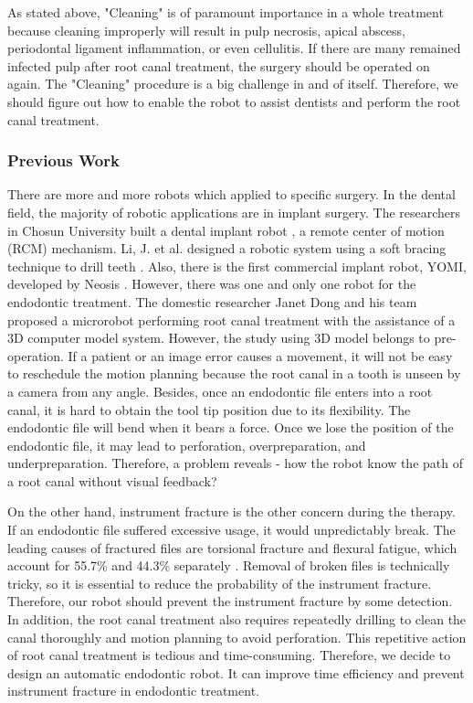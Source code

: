 \par
As stated above, "Cleaning" is of paramount importance in a whole treatment because cleaning improperly will result in pulp necrosis, apical abscess, periodontal ligament inflammation, or even cellulitis. If there are many remained infected pulp after root canal treatment, the surgery should be operated on again. The "Cleaning" procedure is a big challenge in and of itself. Therefore, we should figure out how to enable the robot to assist dentists and perform the root canal treatment.
\subsubsection{Previous Work}
\hspace*{6mm}There are more and more robots which applied to specific surgery. In the dental field, the majority of robotic applications are in implant surgery. The researchers in Chosun University built a dental implant robot \cite{Kim2009ASO}, a remote center of motion (RCM) mechanism. Li, J. et al. designed a robotic system using a soft bracing technique to drill teeth \cite{Li2019ACD}. Also, there is the first commercial implant robot, YOMI, developed by Neosis \cite{web3}. However, there was one and only one robot for the endodontic treatment. The domestic researcher Janet Dong and his team proposed a microrobot performing root canal treatment with the assistance of a 3D computer model system. However, the study using 3D model belongs to pre-operation. If a patient or an image error causes a movement, it will not be easy to reschedule the motion planning because the root canal in a tooth is unseen by a camera from any angle. Besides, once an endodontic file enters into a root canal, it is hard to obtain the tool tip position due to its flexibility. The endodontic file will bend when it bears a force. Once we lose the position of the endodontic file, it may lead to perforation, overpreparation, and underpreparation. Therefore, a problem reveals - how the robot know the path of a root canal without visual feedback? 
\par
On the other hand, instrument fracture is the other concern during the therapy. If an endodontic file suffered excessive usage, it would unpredictably break. The leading causes of fractured files are torsional fracture and flexural fatigue, which account for 55.7\% and 44.3\% separately \cite{SATTAPAN2000161}. Removal of broken files is technically tricky, so it is essential to reduce the probability of the instrument fracture. Therefore, our robot should prevent the instrument fracture by some detection. In addition, the root canal treatment also requires repeatedly drilling to clean the canal thoroughly and motion planning to avoid perforation. This repetitive action of root canal treatment is tedious and time-consuming. Therefore, we decide to design an automatic endodontic robot. It can improve time efficiency and prevent instrument fracture in endodontic treatment.	
\par

